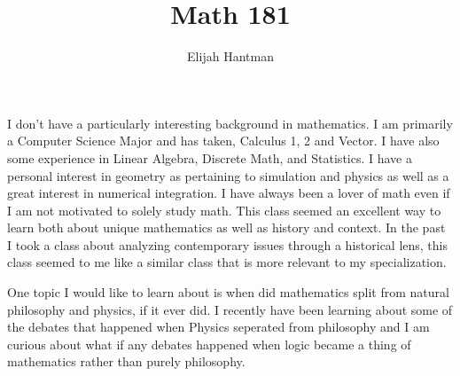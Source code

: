 \documentclass{report}
\title{\Huge{Math 181}}
\author{\huge{Elijah Hantman}}
\date{}
\begin{document}
\maketitle
\newpage


I don't have a particularly interesting background in mathematics.
I am primarily a Computer Science Major and has taken, Calculus 1, 2
and Vector. I have also some experience in Linear Algebra, Discrete Math,
and Statistics. I have a personal interest in geometry as pertaining to
simulation and physics as well as a great interest in numerical integration.
I have always been a lover of math even if I am not motivated to solely study
math. This class seemed an excellent way to learn both about unique mathematics
as well as history and context. In the past I took a class about analyzing
contemporary issues through a historical lens, this class seemed to me like
a similar class that is more relevant to my specialization.

One topic I would like to learn about is when did mathematics split from natural
philosophy and physics, if it ever did. I recently have been learning about some of
the debates that happened when Physics seperated from philosophy and I am curious
about what if any debates happened when logic became a thing of mathematics rather
than purely philosophy.
\end{document}
